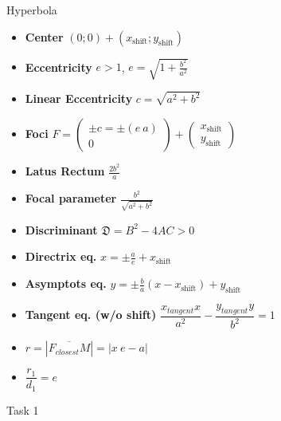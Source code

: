 \documentclass[aspectratio=169]{beamer}
\newcommand{\shf}{\text{shift}}
\begin{document}
\begin{frame}[t]{Hyperbola}
\begin{multicols}{3}
\begin{itemize}
                \item \textbf{Center} $(0;0) + (x_{\shf};y_{\shf})$
                \item \textbf{Eccentricity} $e > 1$, $e = \sqrt{1 + \frac{b^2}{a^2}}$
                \item \textbf{Linear Eccentricity} $c = \sqrt{a^2+b^2}$
                \item \textbf{Foci} $F = \begin{pmatrix} \pm c = \pm (e\ a)\\ 0 \end{pmatrix} + \begin{pmatrix} x_{\shf}\\y_{\shf} \end{pmatrix}$
                \item \textbf{Latus Rectum} $\frac{2b^2}{a}$
                \item \textbf{Focal parameter}  $\frac{b^2}{\sqrt{a^2+b^2}}$
                \item \textbf{Discriminant} $\mathfrak{D} = B^2 - 4AC > 0$
                \item \textbf{Directrix eq.} $x = \pm \frac{a}{e} + x_{\shf}$
                \item \textbf{Asymptots eq.} $y = \pm \frac{b}{a}(x-x_{\shf}) + y_{\shf}$
                \item \textbf{Tangent eq. (w/o shift)} $\dfrac{x_{tangent} x}{a^2}-\dfrac{y_{tangent} y}{b^2}=1$
                \item $r = |\overline{F_{closest}M}|=|x\ e - a|$
                \item $\dfrac{r_1}{d_1}=e$
                \end{itemize}
        \end{multicols}
        \end{frame}

        
\begin{frame}[t]{Task 1}
    \framesubtitle{}
\end{frame}
\end{document}
